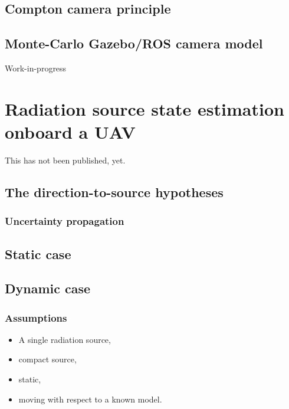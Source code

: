 \documentclass[a4paper,11pt,titlepage,twoside]{book}
\newcommand{\chapternoclear}[1]{
  \begingroup
  \let\cleardoublepage\clearpage
  \chapter{#1}
  \endgroup
}
\begin{document}
\section{Compton camera principle}

\section{Monte-Carlo Gazebo/ROS camera model}

Work-in-progress



\chapternoclear{Radiation source state estimation onboard a UAV}

This has not been published, yet.


\section{The direction-to-source hypotheses}

\subsection{Uncertainty propagation}

\section{Static case}

\section{Dynamic case}

\subsection{Assumptions}

\begin{itemize}
  \item A single radiation source,
  \item compact source,
  \item static,
  \item moving with respect to a known model.
\end{itemize}
\end{document}
